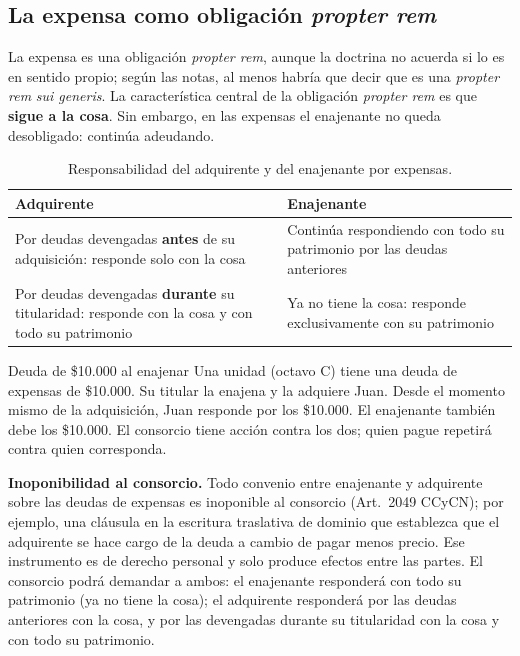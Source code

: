 \documentclass[12pt,oneside]{book}
\begin{document}
\subsection{La expensa como obligación \textit{propter rem}}

La expensa es una obligación \textit{propter rem}, aunque la doctrina no acuerda si lo es en sentido propio; según las notas, al menos habría que decir que es una \textit{propter rem} \textit{sui generis}. La característica central de la obligación \textit{propter rem} es que \textbf{sigue a la cosa}. Sin embargo, en las expensas el enajenante no queda desobligado: continúa adeudando.

\begin{table}[H]
\centering
\begin{tabularx}{\textwidth}{
    >{\raggedright\arraybackslash}X
    >{\raggedright\arraybackslash}X
}
\toprule
\textbf{Adquirente} & \textbf{Enajenante} \\
\midrule
Por deudas devengadas \textbf{antes} de su adquisición: responde solo con la cosa & Continúa respondiendo con todo su patrimonio por las deudas anteriores \\
Por deudas devengadas \textbf{durante} su titularidad: responde con la cosa y con todo su patrimonio & Ya no tiene la cosa: responde exclusivamente con su patrimonio \\
\bottomrule
\end{tabularx}
\caption{Responsabilidad del adquirente y del enajenante por expensas.}
\end{table}

\begin{example}{Deuda de \$10.000 al enajenar}
Una unidad (octavo C) tiene una deuda de expensas de \$10.000. Su titular la enajena y la adquiere Juan. Desde el momento mismo de la adquisición, Juan responde por los \$10.000. El enajenante también debe los \$10.000. El consorcio tiene acción contra los dos; quien pague repetirá contra quien corresponda.
\end{example}

\begin{important}
\textbf{Inoponibilidad al consorcio.} Todo convenio entre enajenante y adquirente sobre las deudas de expensas es inoponible al consorcio (Art.~2049 CCyCN); por ejemplo, una cláusula en la escritura traslativa de dominio que establezca que el adquirente se hace cargo de la deuda a cambio de pagar menos precio. Ese instrumento es de derecho personal y solo produce efectos entre las partes. El consorcio podrá demandar a ambos: el enajenante responderá con todo su patrimonio (ya no tiene la cosa); el adquirente responderá por las deudas anteriores con la cosa, y por las devengadas durante su titularidad con la cosa y con todo su patrimonio.
\end{important}
\end{document}
